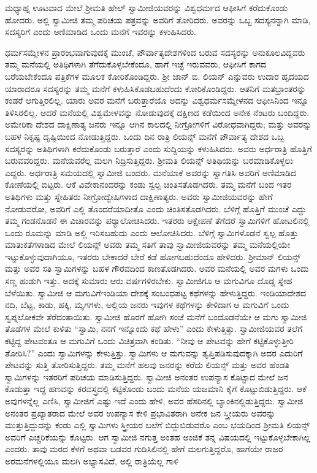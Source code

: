  ಮಧ್ಯಾಹ್ನ ಊಟವಾದ ಮೇಲೆ ಶ‍್ರೀಮತಿ ಹೇಲ್ ಸ್ವಾಮೀಜಿಯವರನ್ನು ವಿಶ್ವಧರ್ಮದ ಆಫೀಸಿಗೆ ಕರೆದುಕೊಂಡು ಹೋದರು. ಅಲ್ಲಿ ಸ್ವಾಮೀಜಿ ತಮ್ಮ ಪರಿಚಯ ಪತ್ರವನ್ನು ಅವರಿಗೆ ತೋರಿದರು. ಅವರನ್ನು ಒಬ್ಬ ಸದಸ್ಯನನ್ನಾಗಿ ಮಾಡಿ, ಸದಸ್ಯರಿಗೆ ಎಂದು ಅಣಿಮಾಡಿದ ಒಂದು ಮನೆಗೆ ಇವರನ್ನು ಕಳುಹಿಸಿದರು. 

 ಧರ್ಮಸಮ್ಮೇಳನ ಪ್ರಾರಂಭವಾಗುವುದಕ್ಕೆ ಮುಂಚೆ, ಪೌರ್ವಾತ್ಯದೇಶಗಳಿಂದ ಬರುವ ಸದಸ್ಯರನ್ನು ಅನುಕೂಲವಿದ್ದವರು ತಮ್ಮ ಮನೆಯಲ್ಲಿ ಅತಿಥಿಗಳಾಗಿ ತೆಗೆದುಕೊಳ್ಳಬೇಕೆಂದೂ, ಹಾಗೆ ಇಚ್ಛೆ ಇರುವವರು, ಆಫೀಸಿಗೆ ಕಾಗದ ಬರೆಯಬೇಕೆಂದೂ ಪತ್ರಿಕೆಗಳ ಮೂಲಕ ಕೋರಿಕೊಂಡಿದ್ದರು. ಶ‍್ರೀ ಜಾನ್ ಬಿ. ಲಿಯನ್ ಎನ್ನುವರು ಉದಾರ ಹೃದಯದ ಯಾರಾದರೂ ಸದಸ್ಯರನ್ನು ತಮ್ಮ ಮನೆಗೆ ಕಳುಹಿಸಿಕೊಡಬಹುದೆಂದು ಕೋರಿಕೊಂಡಿದ್ದರು. ಆತನಿಗೆ ಮತಭ್ರಾಂತರನ್ನು ಕಂಡರೆ ಆಗುತ್ತಿರಲಿಲ್ಲ. ಯಾರು ಅವರ ಮನೆಗೆ ಬರುತ್ತಾರೆಯೊ ಅದನ್ನು ವಿಶ್ವಧರ್ಮಸಮ್ಮೇಳನದ ಆಫೀಸಿನಿಂದ ಇನ್ನೂ ತಿಳಿಸಿರಲಿಲ್ಲ. ಆದರೆ ಮನೆಯಲ್ಲಿ ವಿಶ್ವಮೇಳವನ್ನು ನೋಡುವುದಕ್ಕೆ ದಕ್ಷಿಣದ ಕಡೆಯಿಂದ ಅನೇಕ ನೆಂಟರು ಬಂದಿದ್ದರು. ಅಮೇರಿಕಾ ದೇಶದ ದಾಕ್ಷಿಣಾತ್ಯ ಜನರು ಇನ್ನೂ ಆಗಿನ ಕಾಲದಲ್ಲಿ ನೀಗ್ರೋಗಳಿಗೆ ವಿರೋಧವಾಗಿದ್ದರು; ಮತ್ತು ಅವರನ್ನು ಬಹಳ ನಿಕೃಷ್ಟ ದೃಷ್ಟಿಯಿಂದ ನೋಡುತ್ತಿದ್ದರು. ಒಂದು ದಿನ ರಾತ್ರಿ ಲಿಯನ್ಸ್ ಮನೆಗೆ ಪೌರ್ವಾತ್ಯ ದೇಶದ ಒಬ್ಬ ಸದಸ್ಯರನ್ನು ಅತಿಥಿಗಳಾಗಿ ಕರೆದುಕೊಂಡು ಬರುತ್ತಾರೆ ಎಂದು ಸುದ್ದಿಯನ್ನು ಕಳುಹಿಸಿದರು. ಅವರು ಅರ್ಧರಾತ್ರಿ ಹೊತ್ತಿಗೆ ಬರುವವರಿದ್ದರು. ಮನೆಯವರೆಲ್ಲ ಮಲಗಿ ನಿದ್ರಿಸುತ್ತಿದ್ದರು. ಶ‍್ರೀಮತಿ ಲಿಯನ್ಸ್ ಅತಿಥಿಯನ್ನು ಬರಮಾಡಿಕೊಳ್ಳಲು ಎದ್ದರು. ಅರ್ಧರಾತ್ರಿ ಸಮಯದಲ್ಲಿ ಸ್ವಾಮೀಜಿ ಬಂದರು. ಮನೆಯಾಕೆ ಅವರನ್ನು ಸ್ವಾಗತಿಸಿ ಅವರಿಗೆ ಅಣಿಮಾಡಿದ ಕೋಣೆಯಲ್ಲಿ ಬಿಟ್ಟರು. ಆಕೆ ವಿವೇಕಾನಂದರನ್ನು ಕಂಡು ಸ್ವಲ್ಪ ಚಿಂತಿಸತೊಡಗಿದರು. ತಮ್ಮ ಮನೆಗೆ ಬಂದ ಇತರ ಅತಿಥಿಗಳು ಮತ್ತು ಸ್ನೇಹಿತರು ನೀಗ್ರೋದ್ವೇಷಿಗಳಾದ ದಾಕ್ಷಿಣಾತ್ಯರು. ಅವರು ಸ್ವಾಮೀಜಿಯವರನ್ನು ಹೇಗೆ ನೋಡುವರೋ, ಅವರಿಗೆ ಎಲ್ಲಿ ತೊಂದರೆಯಾದೀತೊ ಎಂದು ಚಿಂತಿಸತೊಡಗಿದರು. ಬೆಳಿಗ್ಗೆ ಹೊತ್ತಿಗೆ ಮುಂಚೆ ಎದ್ದು ತಮ್ಮ ಗಂಡನೊಡನೆ ಈ ವಿಚಾರವನ್ನು ಪರ‍್ಯಾಲೋಚಿಸಿದರು. ಇತರರು ಆಕ್ಷೇಪಣೆ ತೆಗೆದರೆ ಸ್ವಾಮಿಗಳಿಗೆ ಹೋಟಲಿನಲ್ಲಿ ಒಂದು ರೂಮನ್ನು ಮಾಡಿ ಅಲ್ಲಿ ಇರಿಸಬಹುದು ಎಂದು ಆಲೋಚಿಸಿದರು. ಬೆಳಿಗ್ಗೆ ಸ್ವಾಮಿಗಳೊಡನೆ ಸ್ವಲ್ಪ ಹೊತ್ತು ಮಾತುಕತೆಗಳಾಡಿದ ಮೇಲೆ ಲಿಯನ್ಸ್ ಅವರು ತಮ್ಮ ಸತಿಗೆ ತಾವು ಸ್ವಾಮೀಜಿಯವರನ್ನು ತಮ್ಮ ಮನೆಯಲ್ಲಿಯೇ ಇಟ್ಟುಕೊಳ್ಳುವುದಾಗಿಯೂ, ಇತರರು ಬೇಕಾದರೆ ಬೇರೆ ಕಡೆ ಹೋಗಬಹುದೆಂದೂ ಹೇಳಿದರು. ಶ‍್ರೀಮಾನ್ ಲಿಯನ್ಸ್ ಮತ್ತು ಅವರ ಸತಿ ಸ್ವಾಮಿಗಳನ್ನು ಬಹಳ ಗೌರವದಿಂದ ಕಾಣತೊಡಗಿದರು. ಅವರ ಮನೆಯಲ್ಲಿ ಅವರ ಮಗಳು ಒಂದು ಸಣ್ಣ ಹುಡುಗಿ ಇತ್ತು. ಅದಕ್ಕೆ ಸುಮಾರು ಆರು ವರ್ಷಗಳಿರಬೇಕು. ಸ್ವಾಮೀಜಿಗೂ ಆ ಮಗುವಿಗೂ ದೊಡ್ಡ ಸ್ನೇಹ ಬೆಳೆಯಿತು. ಸ್ವಾಮೀಜಿ ಆ ಮಗುವಿಗೆ\break ಇಂಡಿಯಾ ದೇಶಕ್ಕೆ ಸಂಬಂಧಪಟ್ಟ ಕಥೆಗಳನ್ನು ಹೇಳುತ್ತಿದ್ದರು. ಇಂಡಿಯಾದೇಶದ ನದಿ, ಬೆಟ್ಟ, ಕಾಡು, ಹಕ್ಕಿ, ಮೃಗಗಳು, ಅಲ್ಲಿಯ ಜನರು ಇವುಗಳ ಕಥೆಗಳನ್ನು ಕೇಳಿದಾಗ ಆ ಮಗುವಿಗೆ ಒಂದು ಸ್ವಪ್ನಲೋಕವೇ ತೆರೆದಂತಾಯಿತು. ಸ್ವಾಮೀಜಿ ಹೊರಗೆ ಹೋಗಿ ಸಂಜೆ ಮನೆಗೆ ಬಂದೊಡನೆಯೇ ಆ ಮಗು ಸ್ವಾಮೀಜಿ ತೊಡೆಗಳ ಮೇಲೆ ಕುಳಿತು “ಸ್ವಾಮಿ, ನನಗೆ ಇನ್ನೊಂದು ಕಥೆ ಹೇಳು” ಎಂದು ಕೇಳುತ್ತಿತ್ತು. ಸ್ವಾಮೀಜಿಯವರ ತಲೆಗೆ ಕಟ್ಟಿದ್ದ ಪೇಟವಂತೂ ಆ ಮಗುವಿಗೆ ಒಂದು ವಿಚಿತ್ರವಾಗಿ ಕಂಡಿತು. “ನೀವು ಆ ಪೇಟವನ್ನು ಹೇಗೆ ಕಟ್ಟಿಕೊಳ್ಳುತ್ತೀರಿ ತೋರಿಸಿ?” ಎಂದು ಸ್ವಾಮಿಗಳನ್ನು ಕೇಳುತ್ತಿತ್ತು. ಸ್ವಾಮಿಗಳು ಆ ಮಗುವನ್ನು ತೃಪ್ತಿಪಡಿಸುವುದಕ್ಕಾಗಿ ಅದರ ಎದುರಿಗೆ ಪೇಟವನ್ನು ಸುತ್ತಿ ತೋರಿಸುತ್ತಿದ್ದರು. ತಮ್ಮ ಮನೆಗೆ ಹಲವು ಜನರನ್ನು ಕರೆದು ಲಿಯನ್ಸ್ ಮತ್ತು ಅವರ ಹೆಂಡತಿ ಸ್ವಾಮಿಗಳನ್ನು ಇತರರಿಗೆ ಪರಿಚಯ ಮಾಡಿಸುತ್ತಿದ್ದರು. ಸ್ವಾಮೀಜಿ ಅನಂತರ ಉಪನ್ಯಾಸ ಕೊಟ್ಟಾದ ಮೇಲೆ ಜನ ಕೊಡುತ್ತಾ ಇದ್ದ ಹಣವನ್ನು ಕರವಸ್ತ್ರದಲ್ಲಿ ಕಟ್ಟಿಕೊಂಡು ಬಂದು ಮನೆಯ ಯಜಮಾನಿ ಕೈಗೆ ಕೊಟ್ಟುಬಿಡುತ್ತಿದ್ದರು. ಆಕೆ ಅವುಗಳನ್ನೆಲ್ಲ ಎಣಿಸಿ, ಸ್ವಾಮೀಜಿಗೆ ಎಷ್ಟು ಇದೆ ಎಂದು ಹೇಳಿ, ಅವರ ಹೆಸರಿನಲ್ಲಿ ಬ್ಯಾಂಕಿನಲ್ಲಿಡುತ್ತಿದ್ದರು. ಸ್ವಾಮೀಜಿ ಅನಂತರ ಪ್ರಖ್ಯಾತರಾದ ಮೇಲೆ ಅವರ ಉಪನ್ಯಾಸ ಕೇಳಿ ಪ್ರಭಾವಿತರಾಗಿ ಅನೇಕ ಜನ ಸ್ತ್ರೀಯರು ಅವರನ್ನು ಮುತ್ತುತ್ತಿದ್ದುದನ್ನು ಕಂಡು ಎಲ್ಲಿ ಸ್ವಾಮಿಗಳು ಸ್ತ್ರೀಯರ ಬಲೆಗೆ ಬಿದ್ದುಬಿಡುವರೊ ಎಂಬ ಭಯದಿಂದ ಶ‍್ರೀಮತಿ ಲಿಯನ್ಸ್ ಅವರಿಗೆ ಎಚ್ಚರಿಕೆಯನ್ನು ಕೊಟ್ಟರು. ಆಗ ಸ್ವಾಮೀಜಿ ನಗುತ್ತ ಅಂತಹ ಅಂಜಿಕೆ ತನ್ನ ವಿಷಯದಲ್ಲಿ ಇಟ್ಟುಕೊಳ್ಳಬೇಕಾಗಿಲ್ಲ ಎಂದರು. ತಾವು ಮರದ ಕೆಳಗೆ ಅಥವಾ ಬಡವರ ಗುಡಿಸಿಲಿನಲ್ಲಿ ಹೇಗೆ ಮಲಗುತ್ತಿದ್ದರೊ, ಹಾಗೆಯೇ ರಾಜರ ಅರಮನೆಗಳಲ್ಲಿಯೂ ಮಲಗಿ ಅಭ್ಯಾಸವಿದೆ, ಅಲ್ಲಿ ರಾತ್ರಿಯೆಲ್ಲ ಗಾಳಿ 